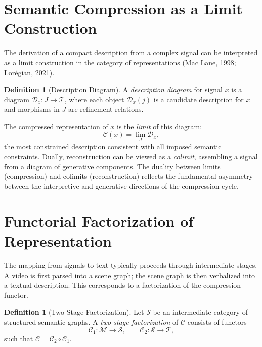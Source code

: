 \documentclass[11pt,a4paper]{article}
\theoremstyle{definition}
\newtheorem{definition}[theorem]{Definition}
\theoremstyle{remark}
\begin{document}
\section{Semantic Compression as a Limit Construction}
\label{sec:limits}

The derivation of a compact description from a complex signal can be interpreted as a limit construction in the category of representations (Mac Lane, 1998; Lor\'{e}gian, 2021).

\begin{definition}[Description Diagram]
A \emph{description diagram} for signal $x$ is a diagram $\mathcal{D}_x : J \rightarrow \mathcal{T}$, where each object $\mathcal{D}_x(j)$ is a candidate description for $x$ and morphisms in $J$ are refinement relations.
\end{definition}

The compressed representation of $x$ is the \emph{limit} of this diagram:
\[
\mathcal{C}(x) = \lim_{J} \mathcal{D}_x,
\]
the most constrained description consistent with all imposed semantic constraints. Dually, reconstruction can be viewed as a \emph{colimit}, assembling a signal from a diagram of generative components. The duality between limits (compression) and colimits (reconstruction) reflects the fundamental asymmetry between the interpretive and generative directions of the compression cycle.

\section{Functorial Factorization of Representation}
\label{sec:factorization}

The mapping from signals to text typically proceeds through intermediate stages. A video is first parsed into a scene graph; the scene graph is then verbalized into a textual description. This corresponds to a factorization of the compression functor.

\begin{definition}[Two-Stage Factorization]
Let $\mathcal{S}$ be an intermediate category of structured semantic graphs. A \emph{two-stage factorization} of $\mathcal{C}$ consists of functors
\[
\mathcal{C}_1 : \mathcal{M} \rightarrow \mathcal{S}, \qquad \mathcal{C}_2 : \mathcal{S} \rightarrow \mathcal{T},
\]
such that $\mathcal{C} = \mathcal{C}_2 \circ \mathcal{C}_1$.
\end{definition}
\end{document}
